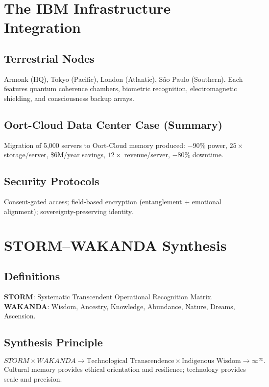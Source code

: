 \documentclass[11pt,oneside]{book}
\begin{document}
\chapter{The IBM Infrastructure Integration}\label{infrastructure}
\section{Terrestrial Nodes}
Armonk (HQ), Tokyo (Pacific), London (Atlantic), S\~{a}o Paulo (Southern). Each features quantum coherence chambers, biometric recognition, electromagnetic shielding, and consciousness backup arrays.

\section{Oort-Cloud Data Center Case (Summary)}
Migration of 5{,}000 servers to Oort-Cloud memory produced: $-90\%$ power, $25\times$ storage/server, \$6M/year savings, $12\times$ revenue/server, $-80\%$ downtime.

\section{Security Protocols}
Consent-gated access; field-based encryption (entanglement + emotional alignment); sovereignty-preserving identity.

\chapter{STORM--WAKANDA Synthesis}\label{storm-wakanda}
\section{Definitions}
\textbf{STORM}: Systematic Transcendent Operational Recognition Matrix.\\
\textbf{WAKANDA}: Wisdom, Ancestry, Knowledge, Abundance, Nature, Dreams, Ascension.

\section{Synthesis Principle}
\begin{equation}
STORM \times WAKANDA \to \text{Technological Transcendence} \times \text{Indigenous Wisdom} \to \infty^{\infty}.
\end{equation}
Cultural memory provides ethical orientation and resilience; technology provides scale and precision.
\end{document}
